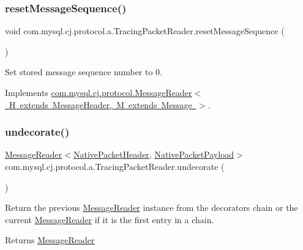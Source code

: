 \subsubsection{\texorpdfstring{reset\+Message\+Sequence()}{resetMessageSequence()}}
{\footnotesize\ttfamily void com.\+mysql.\+cj.\+protocol.\+a.\+Tracing\+Packet\+Reader.\+reset\+Message\+Sequence (\begin{DoxyParamCaption}{ }\end{DoxyParamCaption})}

Set stored message sequence number to 0. 

Implements \mbox{\hyperlink{interfacecom_1_1mysql_1_1cj_1_1protocol_1_1_message_reader_a3161e55ab8c1bb4d533aa6d2700fb14d}{com.\+mysql.\+cj.\+protocol.\+Message\+Reader$<$ H extends Message\+Header, M extends Message $>$}}.

\mbox{\label{classcom_1_1mysql_1_1cj_1_1protocol_1_1a_1_1_tracing_packet_reader_a5fab05e4e4ab55adf0f0755d7ca6513d}} 
\subsubsection{\texorpdfstring{undecorate()}{undecorate()}}
{\footnotesize\ttfamily \mbox{\hyperlink{interfacecom_1_1mysql_1_1cj_1_1protocol_1_1_message_reader}{Message\+Reader}}$<$\mbox{\hyperlink{classcom_1_1mysql_1_1cj_1_1protocol_1_1a_1_1_native_packet_header}{Native\+Packet\+Header}}, \mbox{\hyperlink{classcom_1_1mysql_1_1cj_1_1protocol_1_1a_1_1_native_packet_payload}{Native\+Packet\+Payload}}$>$ com.\+mysql.\+cj.\+protocol.\+a.\+Tracing\+Packet\+Reader.\+undecorate (\begin{DoxyParamCaption}{ }\end{DoxyParamCaption})}

Return the previous \mbox{\hyperlink{interfacecom_1_1mysql_1_1cj_1_1protocol_1_1_message_reader}{Message\+Reader}} instance from the decorators chain or the current \mbox{\hyperlink{interfacecom_1_1mysql_1_1cj_1_1protocol_1_1_message_reader}{Message\+Reader}} if it is the first entry in a chain.

\begin{DoxyReturn}{Returns}
\mbox{\hyperlink{interfacecom_1_1mysql_1_1cj_1_1protocol_1_1_message_reader}{Message\+Reader}} 
\end{DoxyReturn}



